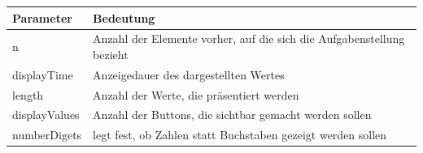 \begin{frame}
	\begin{table}[htbp]

	    \begin{center}
	        \begin{footnotesize}
	            \begin{tabularx}{\linewidth}{l X}
	                \textbf{Parameter} & \textbf{Bedeutung}\\
	                \hline
	                n & Anzahl der Elemente vorher, auf die sich die Aufgabenstellung bezieht\\
	                displayTime & Anzeigedauer des dargestellten Wertes\\
	                length & Anzahl der Werte, die präsentiert werden\\
	                displayValues & Anzahl der Buttons, die sichtbar gemacht werden sollen \\
	                numberDigets & legt fest, ob Zahlen statt Buchstaben gezeigt werden sollen
	                
	            \end{tabularx}
	        \end{footnotesize}
	        
	        \label{tbl:paramNBack}
	    \end{center}
	    
	\end{table}
\end{frame}